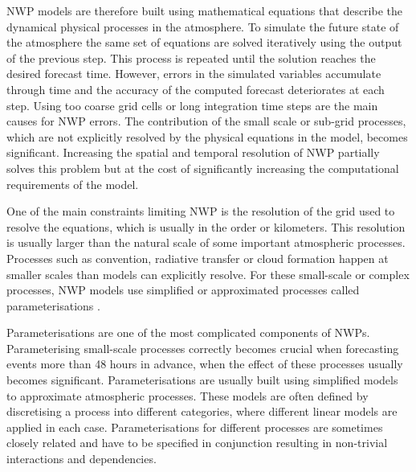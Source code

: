 NWP models are therefore built using mathematical equations that describe the dynamical physical processes in the atmosphere. To simulate the future state of the atmosphere the same set of equations are solved iteratively using the output of the previous step. This process is repeated until the solution reaches the desired forecast time. However, errors in the simulated variables accumulate through time and the accuracy of the computed forecast deteriorates at each step. Using too coarse grid cells or long integration time steps are the main causes for NWP errors. The contribution of the small scale or sub-grid processes, which are not explicitly resolved by the physical equations in the model, becomes significant. Increasing the spatial and temporal resolution of NWP partially solves this problem but at the cost of significantly increasing the computational requirements of the model.

\medskip

One of the main constraints limiting NWP is the resolution of the grid used to resolve the equations, which is usually in the order or kilometers. This resolution is usually larger than the natural scale of some important atmospheric processes. Processes such as convention, radiative transfer or cloud formation happen at smaller scales than models can explicitly resolve. For these small-scale or complex processes, NWP models use simplified or approximated processes called parameterisations \citep{milton1996impact,delage1997parameterising}. 

\medskip

Parameterisations are one of the most complicated components of NWPs. Parameterising small-scale processes correctly becomes crucial when forecasting events more than 48 hours in advance, when the effect of these processes usually becomes significant. Parameterisations are usually built using simplified models to approximate atmospheric processes. These models are often defined by discretising a process into different categories, where different linear models are applied in each case. Parameterisations for different processes are sometimes closely related and have to be specified in conjunction resulting in non-trivial interactions and dependencies.

\medskip

